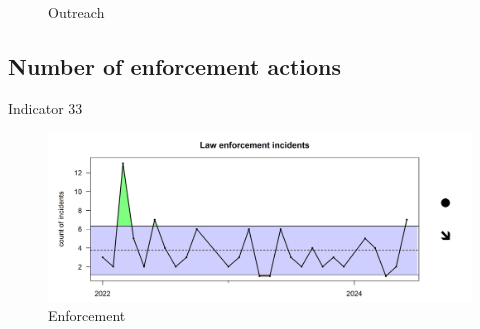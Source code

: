 \documentclass[
  letterpaper,
  oneside,
  open=any]{scrbook}
\begin{document}
\begin{figure}


\caption{\label{fig-outreach}Outreach}

\end{figure}%

\subsection{Number of enforcement
actions}\label{number-of-enforcement-actions}

Indicator 33

\begin{figure}[H]

{\centering \includegraphics{indicator_plots/enforcement_plot_final.png}

}

\caption{Enforcement}

\end{figure}%
\end{document}

